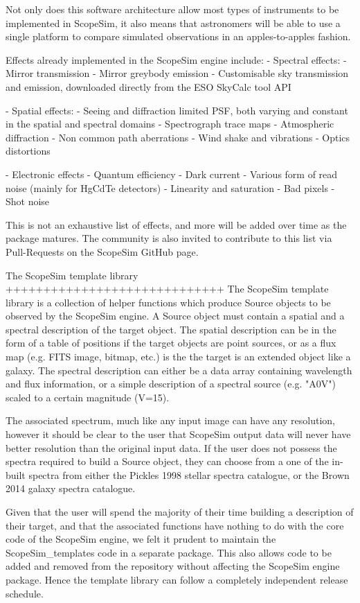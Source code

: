 Not only does this software architecture allow most types of instruments to be
implemented in ScopeSim, it also means that astronomers will be able to use a
single platform to compare simulated observations in an apples-to-apples
fashion.

Effects already implemented in the ScopeSim engine include:
- Spectral effects:
    - Mirror transmission
    - Mirror greybody emission
    - Customisable sky transmission and emission, downloaded directly from the
      ESO SkyCalc tool API

- Spatial effects:
    - Seeing and diffraction limited PSF, both varying and constant in the
      spatial and spectral domains
    - Spectrograph trace maps
    - Atmospheric diffraction
    - Non common path aberrations
    - Wind shake and vibrations
    - Optics distortions

- Electronic effects
    - Quantum efficiency
    - Dark current
    - Various form of read noise (mainly for HgCdTe detectors)
    - Linearity and saturation
    - Bad pixels
    - Shot noise

This is not an exhaustive list of effects, and more will be added over time as
the package matures. The community is also invited to contribute to this list
via Pull-Requests on the ScopeSim GitHub page.


The ScopeSim template library
+++++++++++++++++++++++++++++
The ScopeSim template library is a collection of helper functions which produce
Source objects to be observed by the ScopeSim engine. A Source object must
contain a spatial and a spectral description of the target object. The spatial
description can be in the form of a table of positions if the target objects are
point sources, or as a flux map (e.g. FITS image, bitmap, etc.) is the the
target is an extended object like a galaxy. The spectral description can either
be a data array containing wavelength and flux information, or a simple
description of a spectral source (e.g. "A0V") scaled to a certain magnitude
(V=15).

The associated spectrum, much like any input image can have any resolution,
however it should be clear to the user that ScopeSim output data will never
have better resolution than the original input data. If the user does not
possess the spectra required to build a Source object, they can choose from a
one of the in-built spectra from either the Pickles 1998 stellar spectra
catalogue, or the Brown 2014 galaxy spectra catalogue.

Given that the user will spend the majority of their time building a description
of their target, and that the associated functions have nothing to do with the
core code of the ScopeSim engine, we felt it prudent to maintain the
ScopeSim_templates code in a separate package. This also allows code to be added
and removed from the repository without affecting the ScopeSim engine package.
Hence the template library can follow a completely independent release schedule.


